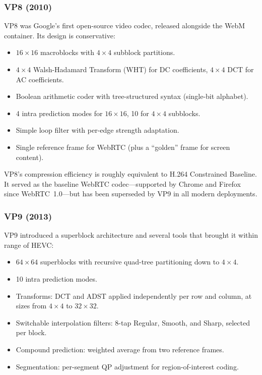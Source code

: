 \subsubsection{VP8 (2010)}
\label{sec:vp8}

VP8 was Google's first open-source video codec, released alongside the
WebM container. Its design is conservative:

\begin{itemize}
\item $16\!\times\!16$ macroblocks with $4\!\times\!4$ subblock partitions.
\item $4\!\times\!4$ Walsh-Hadamard Transform (WHT) for DC coefficients,
  $4\!\times\!4$ DCT for AC coefficients.
\item Boolean arithmetic coder with tree-structured syntax (single-bit
  alphabet).
\item 4 intra prediction modes for $16\!\times\!16$, 10 for
  $4\!\times\!4$ subblocks.
\item Simple loop filter with per-edge strength adaptation.
\item Single reference frame for WebRTC (plus a ``golden'' frame for
  screen content).
\end{itemize}

VP8's compression efficiency is roughly equivalent to H.264 Constrained
Baseline. It served as the baseline WebRTC codec---supported by Chrome and
Firefox since WebRTC~1.0---but has been superseded by VP9 in all modern
deployments.

\subsubsection{VP9 (2013)}
\label{sec:vp9}

VP9 introduced a superblock architecture and several tools that brought it
within range of HEVC:

\begin{itemize}
\item $64\!\times\!64$ superblocks with recursive quad-tree partitioning
  down to $4\!\times\!4$.
\item 10 intra prediction modes.
\item Transforms: DCT and ADST applied independently per row and column,
  at sizes from $4\!\times\!4$ to $32\!\times\!32$.
\item Switchable interpolation filters: 8-tap Regular, Smooth, and
  Sharp, selected per block.
\item Compound prediction: weighted average from two reference frames.
\item Segmentation: per-segment QP adjustment for region-of-interest
  coding.
\end{itemize}

